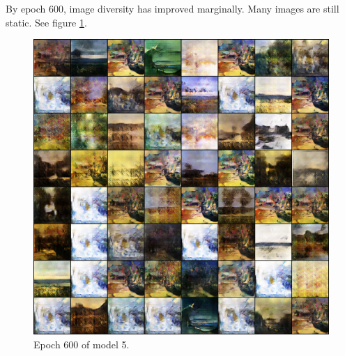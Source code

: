 \documentclass[11pt,letterpaper]{article}
\begin{document}
				By epoch 600, image diversity has improved marginally.
				Many images are still static.
				See figure \ref{fig:wa128:epoch600generator}.
				\begin{figure}
					\centering
					\includegraphics[width=1.0\linewidth]{results/model5/epoch600_generator}
					\caption{Epoch 600 of model 5.}
					\label{fig:wa128:epoch600generator}
				\end{figure}
\end{document}
